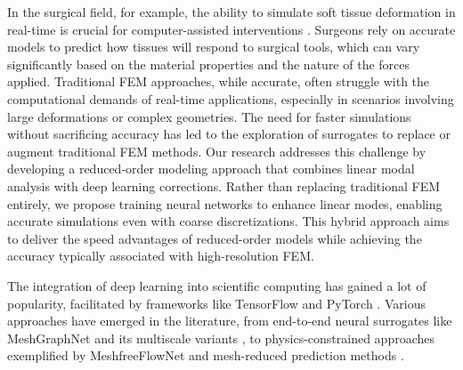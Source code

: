 In the surgical field, for example, the ability to simulate soft tissue deformation in real-time is crucial for computer-assisted interventions \cite{petit:hal-01930366}. Surgeons rely on accurate models to predict how tissues will respond to surgical tools, which can vary significantly based on the material properties and the nature of the forces applied. Traditional FEM approaches, while accurate, often struggle with the computational demands of real-time applications, especially in scenarios involving large deformations or complex geometries. The need for faster simulations without sacrificing accuracy has led to the exploration of surrogates to replace or augment traditional FEM methods. 
Our research addresses this challenge by developing a reduced-order modeling approach that combines linear modal analysis with deep learning corrections. Rather than replacing traditional FEM entirely, we propose training neural networks to enhance linear modes, enabling accurate simulations even with coarse discretizations. This hybrid approach aims to deliver the speed advantages of reduced-order models while achieving the accuracy typically associated with high-resolution FEM.


The integration of deep learning into scientific computing has gained a lot of popularity, facilitated by frameworks like TensorFlow \cite{tensorflow2015-whitepaper} and PyTorch \cite{paszke2019pytorchimperativestylehighperformance}. Various approaches have emerged in the literature, from end-to-end neural surrogates like MeshGraphNet \cite{pfaffLearningMeshBasedSimulation2021a} and its multiscale variants \cite{fortunatoMultiScaleMeshGraphNets2022}, to physics-constrained approaches exemplified by MeshfreeFlowNet \cite{jiangMeshfreeFlowNetPhysicsConstrainedDeep2020} and mesh-reduced prediction methods \cite{hanPredictingPhysicsMeshreduced2022a}.


